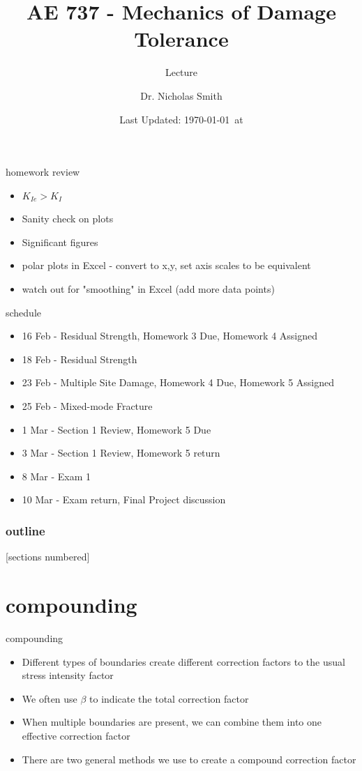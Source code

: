 \documentclass[10pt]{beamer}
\title{AE 737 - Mechanics of Damage Tolerance}
\subtitle{Lecture \arabic{lecture}}
\date{Last Updated: \today\ at \DTMcurrenttime}
\author{Dr. Nicholas Smith}
\institute{Wichita State University, Department of Aerospace Engineering}
\begin{document}
\maketitle

\begin{frame}{homework review}
	\begin{itemize}
		\item $K_{Ie} > K_I$
		\item Sanity check on plots
		\item Significant figures
		\item polar plots in Excel - convert to x,y, set axis scales to be equivalent
		\item watch out for "smoothing" in Excel (add more data points)
	\end{itemize}
\end{frame}

\begin{frame}{schedule}
	\begin{itemize}
		\item 16 Feb - Residual Strength, Homework 3 Due, Homework 4 Assigned
		\item 18 Feb - Residual Strength
		\item 23 Feb - Multiple Site Damage, Homework 4 Due, Homework 5 Assigned
		\item 25 Feb - Mixed-mode Fracture
		\item 1 Mar - Section 1 Review, Homework 5 Due
		\item 3 Mar - Section 1 Review, Homework 5 return
		\item 8 Mar - Exam 1
		\item 10 Mar - Exam return, Final Project discussion
	\end{itemize}
\end{frame}

\begin{frame}
  \frametitle{outline}
  [sections numbered]
  \tableofcontents[hideallsubsections]
\end{frame}

\section{compounding}
\begin{frame}{compounding}
	\begin{itemize}
		\item Different types of boundaries create different correction factors to the usual stress intensity factor
		\item We often use $\beta$ to indicate the total correction factor
		\item When multiple boundaries are present, we can combine them into one effective correction factor
		\item There are two general methods we use to create a compound correction factor
	\end{itemize}
\end{frame}
\end{document}
